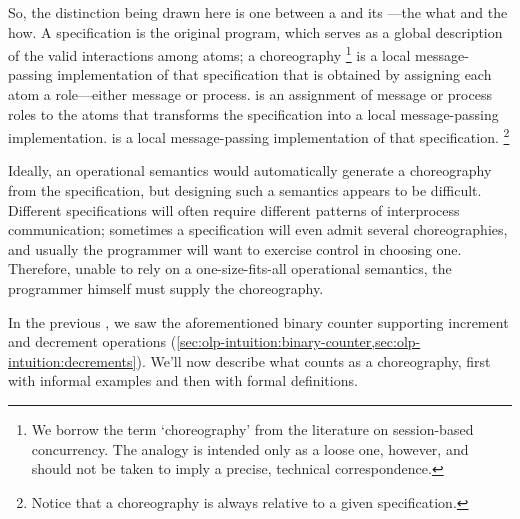 \documentclass[
  class=../hdeyoung-proposal,
  crop=false
]{standalone}
\begin{document}
So, the distinction being drawn here is one between a  and its ---the what and the how.
A specification is the original program, which serves as a global description of the valid interactions among atoms; a choreography%
\footnote{We borrow the term \enquote*{choreography} from the literature on session-based concurrency.
The analogy is intended only as a loose one, however, and should not be taken to imply a precise, technical correspondence.}
is a local message-passing implementation of that specification that is obtained by assigning each atom a role---either message or process.
is an assignment of message or process roles to the atoms that transforms the specification into a local message-passing implementation.
is a local message-passing implementation of that specification.%
\footnote{Notice that a choreography is always relative to a given specification.}

Ideally, an operational semantics would automatically generate a choreography from the specification, but designing such a semantics appears to be difficult.
Different specifications will often require different patterns of interprocess communication;
sometimes a specification will even admit several choreographies, and usually the programmer will want to exercise control in choosing one.
Therefore, unable to rely on a one-size-fits-all operational semantics, the programmer himself must supply the choreography.

In the previous , we saw the aforementioned binary counter supporting increment and decrement operations (\cref{sec:olp-intuition:binary-counter,sec:olp-intuition:decrements}).
We'll now describe what counts as a choreography, first with informal examples and then with formal definitions.
\end{document}
